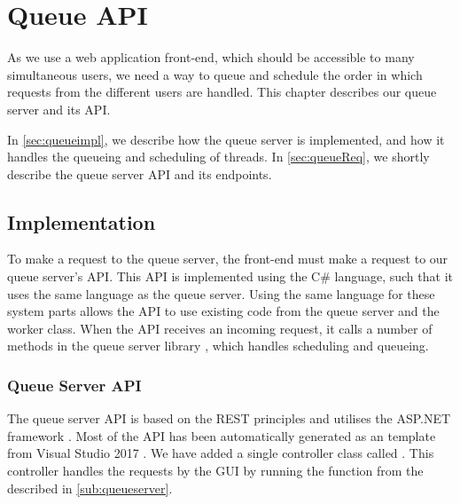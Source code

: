 \chapter{Queue \acs{API}}\label{queueAPI}
As we use a web application front-end, which should be accessible to many
simultaneous users, we need a way to queue and schedule the order in which
requests from the different users are handled. This chapter describes our queue
server and its \ac{API}.\nl

In \autoref{sec:queueimpl}, we describe how the queue server is implemented, and
how it handles the queueing and scheduling of threads. In
\autoref{sec:queueReq}, we shortly describe the queue server \ac{API} and its endpoints. 

\section{Implementation}\label{sec:queueimpl}
To make a request to the queue server, the front-end must make a
request to our queue server's \ac{API}. This \ac{API} is implemented using the 
C\# language, such that it uses the same language as the queue server.
Using the same language for these system parts allows the \ac{API} to use
existing code from the queue server and the worker class. When the
\ac{API} receives an incoming request, it calls a number of methods in the queue
server library , which handles scheduling and queueing.

\subsection{Queue Server \ac{API}}
The queue server \ac{API} is based on the \ac{REST} principles
\citep{principlesREST} and utilises the ASP.NET framework
\citep{aspNEToverview}. Most of the \ac{API} has been automatically generated as
an  template from Visual Studio 2017
\citep{vsMainPage}. We have added a single controller class
called . This controller handles the
 requests by the \ac{GUI} by running the  function
from the \\ described in \autoref{sub:queueserver}.

